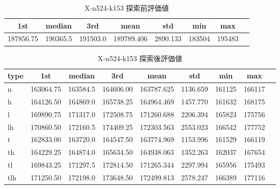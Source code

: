 \begin{table}[htbp]
    \centering
    \caption{X-n524-k153 探索前評価値}
    \begin{tabular}{|l|l|l|l|l|l|l|l|}\hline
    \multicolumn{1}{|c|}{\textbf{1st}}
    &\multicolumn{1}{c|}{\textbf{median}}
    &\multicolumn{1}{c|}{\textbf{3rd}}
    &\multicolumn{1}{c|}{\textbf{mean}}
    &\multicolumn{1}{c|}{\textbf{std}}
    &\multicolumn{1}{c|}{\textbf{min}}
    &\multicolumn{1}{c|}{\textbf{max}}\\\hline
	187856.75 & 190365.5 & 191503.0 & 189789.406 & 2890.133 & 183504 & 195483\\\hline
	\end{tabular}
\end{table}
\begin{table}[htbp]
    \centering
    \caption{X-n524-k153 探索後評価値}
    \begin{tabular}{|l|l|l|l|l|l|l|l|l|}\hline
    \multicolumn{1}{|c|}{\textbf{type}}
    &\multicolumn{1}{|c|}{\textbf{1st}}
    &\multicolumn{1}{c|}{\textbf{median}}
    &\multicolumn{1}{c|}{\textbf{3rd}}
    &\multicolumn{1}{c|}{\textbf{mean}}
    &\multicolumn{1}{c|}{\textbf{std}}
    &\multicolumn{1}{c|}{\textbf{min}}
    &\multicolumn{1}{c|}{\textbf{max}}\\\hline
	n & 163064.75 & 163584.5 & 164606.00 & 163787.625 & 1136.659 & 161125 & 166117\\\hline
	h & 164126.50 & 164869.0 & 165738.25 & 164964.469 & 1457.770 & 161632 & 168175\\\hline
	l & 169890.75 & 171317.0 & 172508.75 & 171260.688 & 2206.394 & 165823 & 175756\\\hline
	lh & 170860.50 & 172160.5 & 174409.25 & 172303.563 & 2553.023 & 166542 & 177752\\\hline
	t & 162833.00 & 163720.0 & 164547.50 & 163774.969 & 1153.996 & 161529 & 166119\\\hline
	th & 164229.25 & 164874.0 & 165634.50 & 164938.063 & 1352.263 & 162037 & 167654\\\hline
	tl & 169843.25 & 171297.5 & 172814.50 & 171265.344 & 2297.994 & 165956 & 175493\\\hline
	tlh & 171250.50 & 172198.0 & 173648.50 & 172499.813 & 2578.247 & 166389 & 177116\\\hline
	\end{tabular}
\end{table}
